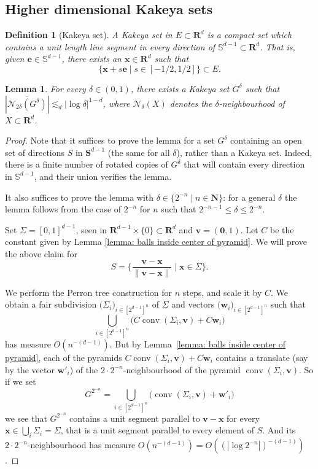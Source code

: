 \documentclass[10pt]{amsart}
\newcommand{\R}{\mathbf{R}}
\newcommand{\N}{\mathbf{N}}
\newcommand{\conv}{\operatorname{conv}}
\newtheorem{lemma}[theorem]{Lemma}
\newtheorem{definition}[theorem]{Definition}
\begin{document}
\subsection{Higher dimensional Kakeya sets}
\begin{definition}[Kakeya set]
A Kakeya set in $E\subset \R^d$ is a compact set which contains a
unit length line segment in every direction of $\mathbb S^{d-1}\subset \R^d$. That is, given $\mathbf{e}\in \mathbb S^{d-1}$, there exists an $\mathbf{x}\in \R^d$ such that
\begin{equation*}
    \{\mathbf{x}+s\mathbf{e}\mid s\in [-1/2,1/2]\}\subset E.
\end{equation*}
\end{definition}
\begin{lemma}\label{lemma: lemma kakeya}For every $\delta\in (0,1)$, there exists a Kakeya set $G^\delta$ such that $|\overline{\mathcal{N}_{2\delta}(G^\delta)}|\lesssim_d|\log\delta|^{1-d}$, where $\mathcal{N}_\delta(X)$ denotes the $\delta$-neighbourhood of $X\subset \R^d$.
\end{lemma}
\begin{proof}
Note that it suffices to prove the lemma for a set $G^\delta$ containing an open set of directions $S$ in $\mathbf{S}^{d-1}$ (the same for all $\delta$), rather than a Kakeya set. Indeed, there is a finite number of rotated copies of $G^\delta$ that will contain every direction in $\mathbb{S}^{d-1}$, and their union verifies the lemma.

It also suffices to prove the lemma with $\delta \in \{ 2^{-n} \mid n \in \N\}$: for a general $\delta$ the lemma follows from the case of $2^{-n}$ for $n$ such that $2^{-n-1} \leq \delta \leq 2^{-n}$.

Set $\Sigma = [0,1]^{d-1}$, seen in $\R^{d-1}\times\{0\} \subset \R^{d}$ and $\mathbf{v}=(\mathbf{0},1)$. Let $C$ be the constant given by Lemma \ref{lemma: balls inside center of pyramid}. We will prove the above claim for
\[ S = \Big\{ \frac{\mathbf{v} - \mathbf{x}}{\|\mathbf{v} - \mathbf{x}\|} \mid \mathbf{x} \in \Sigma\Big\}.\]

We perform the Perron tree construction for $n$ steps, and scale it by $C$. We obtain a fair subdivision $\big(\Sigma_i\big)_{i\in [2^{d-1}]^n}$ of $\Sigma$ and vectors $\big(\mathbf{w}_i\big)_{i\in [2^{d-1}]^n}$ such that
\[ \bigcup_{i \in  [2^{d-1}]^n} \big(C \conv(\Sigma_i,\mathbf{v}) + C\mathbf{w}_i\big)\]
has measure $O(n^{-(d-1)})$. But by Lemma~\ref{lemma: balls inside center of pyramid}, each of the pyramids $C \conv(\Sigma_i,\mathbf{v}) + C\mathbf{w}_i$ contains a translate (say by the vector $\mathbf{w}'_i$) of the $2\cdot 2^{-n}$-neighbourhood of the pyramid $\conv(\Sigma_i,\mathbf{v})$. So if we set
\[ G^{2^{-n}} = \bigcup_{i \in  [2^{d-1}]^n} \big(\conv(\Sigma_i,\mathbf{v}) + \mathbf{w}'_i\big)\]
we see that $G^{2^{-n}}$ contains a unit segment parallel to $\mathbf v - \mathbf x$ for every $\mathbf{x} \in \bigcup_i \Sigma_i=\Sigma$, that is a unit segment parallel to every element of $S$. And its $2\cdot 2^{-n}$-neighbourhood has measure $O(n^{-(d-1)}) = O((|\log 2^{-n}|)^{-(d-1)})$.
\end{proof}
\end{document}
